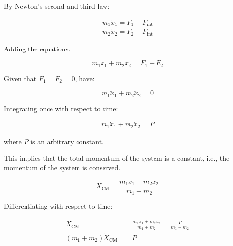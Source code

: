 \documentclass[12pt]{article}
\begin{document}

By Newton's second and third law:

\begin{equation}
\begin{split}
    m_{1} \ddot{x}_{1} = F_{1} + F_{\text{int}} \\
    m_{2} \ddot{x}_{2} = F_{2} - F_{\text{int}}
\end{split}
\end{equation}

Adding the equations:

\begin{equation}
    m_{1} \ddot{x}_{1} + m_{2} \ddot{x}_{2} = F_{1} + F_{2}
\end{equation}

Given that $F_{1} = F_{2} = 0$, have:

\begin{equation}
    m_{1} \ddot{x}_{1} + m_{2} \ddot{x}_{2} = 0
\end{equation}

Integrating once with respect to time:

\begin{equation}
\begin{split}
    m_{1} \dot{x}_{1} + m_{2} \dot{x}_{2} = P
\end{split}
\end{equation}

where $P$ is an arbitrary constant.

This implies that the total momentum of the system is a constant, i.e., the momentum of the system is conserved.


\begin{equation}
    X_{\text{CM}} = \frac{m_{1} x_{1} + m_{2} x_{2}}{m_{1} + m_{2}}
\end{equation}

Differentiating with respect to time:

\begin{equation}
\begin{split}
    \dot{X}_{\text{CM}} &= \frac{m_{1} \dot{x_{1}} + m_{2} \dot{x_{2}}}{m_{1} + m_{2}} = \frac{P}{m_{1} + m_{2}} \\
    (m_{1} + m_{2}) \dot{X}_{\text{CM}} &= P
\end{split}
\end{equation}
\end{document}
